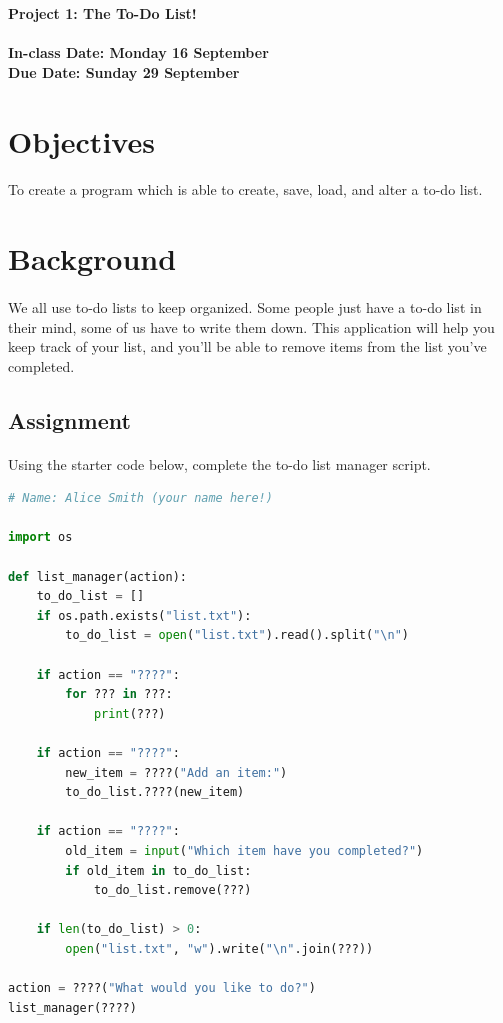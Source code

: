 \documentclass[letter,10pt]{article}
\begin{document}
    
    \huge
    \textbf{Project 1: The To-Do List!}
    \normalsize
    \\ ~~ \\
    \textbf{In-class Date: Monday 16 September} \\
    \textbf{Due Date: Sunday 29 September}
    
    \section*{Objectives}
    \paragraph{}To create a program which is able to create, save, load, and alter a to-do list.
    
    \section*{Background}
    \paragraph{}We all use to-do lists to keep organized. Some people just have a to-do list in their mind, some of us have to write them down. This application will help you keep track of your list, and you'll be able to remove items from the list you've completed.
    
    \subsection*{Assignment}
    \paragraph{}Using the starter code below, complete the to-do list manager script.
    
    \begin{lstlisting}[language=python]
# Name: Alice Smith (your name here!)

import os

def list_manager(action):
    to_do_list = []
    if os.path.exists("list.txt"):
        to_do_list = open("list.txt").read().split("\n")
    
    if action == "????":
        for ??? in ???:
            print(???)
    
    if action == "????":
        new_item = ????("Add an item:")
        to_do_list.????(new_item)
    
    if action == "????":
        old_item = input("Which item have you completed?")
        if old_item in to_do_list:
            to_do_list.remove(???)
    
    if len(to_do_list) > 0:
        open("list.txt", "w").write("\n".join(???))
    
action = ????("What would you like to do?")
list_manager(????)
    \end{lstlisting}
    
\end{document}
